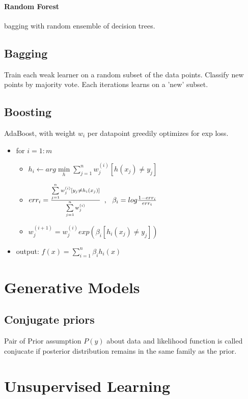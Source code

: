 \documentclass[11pt,twocolumn]{article}
\begin{document}
\paragraph{Random Forest} bagging with random ensemble of decision trees.

\subsection{Bagging}
Train each weak learner on a random subset of the data points. Classify new points by majority vote. Each iterations learns on a 'new' subset.

\subsection{Boosting}

AdaBoost, with weight $w_i$ per datapoint greedily optimizes for exp loss.
\begin{itemize}[noitemsep,nolistsep]
\item for $i=1:m$
\begin{itemize}[noitemsep,nolistsep]
\item $h_i \leftarrow arg \min \limits_h \sum \limits_{j=1}^n  w_j^{(i)}[h(x_j) \neq y_j]$
\item $err_i = {{\sum \limits_{j=1}^n w_j^{(i)}[y_j \neq h_i(x_j)]}\over{\sum \limits_{j=1}^n w_j^{(i)}}} $
$,~~\beta_i = log {{1-err_i}\over{err_i}}$

\item $w_j^{(i+1)} = w_j^{(i)} exp(\beta_i [h_i(x_j) \neq y_j])$
\end{itemize}
\item output: $f(x) = \sum \limits_{i=1}^n \beta_i h_i (x)$
\end{itemize}


\section{Generative Models}

\subsection{Conjugate priors}
Pair of Prior assumption $P(y)$ about data and likelihood function is called conjucate if posterior distribution remains in the same family as the prior.	

\section{Unsupervised Learning}
\end{document}
